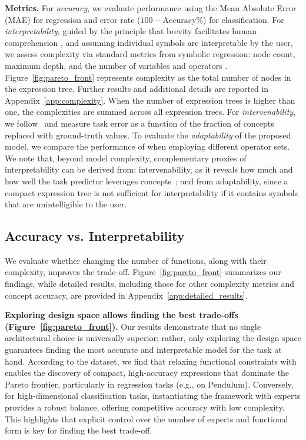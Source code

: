 \documentclass{article}
\theoremstyle{plain}
\theoremstyle{definition}
\theoremstyle{remark}
\newcommand{\mypar}[1]{\noindent\textbf{#1}}
\begin{document}
\mypar{Metrics.}
For \emph{accuracy}, we evaluate performance using the Mean Absolute Error (MAE) for regression and error rate ($100{-}\text{Accuracy}\%$) for classification. 
For \emph{interpretability}, guided by the principle that brevity facilitates human comprehension \citep{miller1956magical, narayanan2018humans}, and assuming individual symbols are interpretable by the user, we assess complexity via standard metrics from symbolic regression: node count, maximum depth, and the number of variables and operators \citep{smits2005pareto}. Figure~\ref{fig:pareto_front} represents complexity as the total number of nodes in the expression tree. Further results and additional details are reported in Appendix~\ref{app:complexity}. When the number of expression trees is higher than one, the complexities are summed across all expression trees. For \emph{intervenability}, we follow~\citet{koh2020concept,zarlenga2022concept} and measure task error as a function of the fraction of concepts replaced with ground-truth values. 
To evaluate the \emph{adaptability} of the proposed model, we compare the performance of \symbolicacro{} when employing different operator sets.
We note that, beyond model complexity, complementary proxies of interpretability can be derived from: intervenability, as it reveals how much and how well the task predictor leverages concepts~\citep{koh2020concept}; and from adaptability, since a compact expression tree is not sufficient for interpretability if it contains symbols that are unintelligible to the user.
% 

\subsection{Accuracy vs. Interpretability}
\label{sec:exp_acc}

We evaluate whether changing the number of functions, along with their complexity, improves the \ai{} trade-off. Figure~\ref{fig:pareto_front} summarizes our findings, while detailed results, including those for other complexity metrics and concept accuracy, are provided in Appendix~\ref{app:detailed_results}.

\mypar{Exploring \classacro{} design space allows finding the best trade-offs (Figure~\ref{fig:pareto_front}).}
Our results demonstrate that no single architectural choice is universally superior; rather, only exploring the \classacro{} design space guarantees finding the most accurate and interpretable model for the task at hand. According to the dataset, we find that relaxing functional constraints with \symbolic{} enables the discovery of compact, high-accuracy expressions that dominate the Pareto frontier, particularly in regression tasks (e.g., on Pendulum). Conversely, for high-dimensional classification tasks, instantiating the framework with \linear{} experts provides a robust balance, offering competitive accuracy with low complexity. This highlights that explicit control over the number of experts and functional form is key for finding the best \ai{} trade-off.
\end{document}
